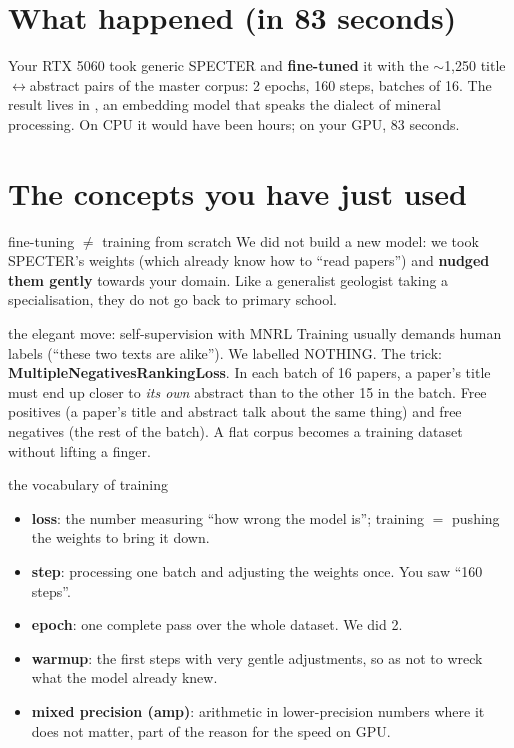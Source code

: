 \documentclass[11pt,a4paper]{article}
\begin{document}
\section{What happened (in 83 seconds)}

Your RTX 5060 took generic SPECTER and \textbf{fine-tuned} it with the $\sim$1,250
title$\leftrightarrow$abstract pairs of the master corpus: 2 epochs, 160 steps, batches of 16.
The result lives in , an embedding model that speaks the dialect
of mineral processing. On CPU it would have been hours; on your GPU, 83 seconds.

\section{The concepts you have just used}

\begin{concepto}{fine-tuning $\neq$ training from scratch}
We did not build a new model: we took SPECTER's weights (which already know how to ``read
papers'') and \textbf{nudged them gently} towards your domain. Like a generalist geologist
taking a specialisation, they do not go back to primary school.
\end{concepto}

\begin{concepto}{the elegant move: self-supervision with MNRL}
Training usually demands human labels (``these two texts are alike''). We labelled NOTHING. The
trick: \textbf{MultipleNegativesRankingLoss}. In each batch of 16 papers, a paper's title must
end up closer to \emph{its own} abstract than to the other 15 in the batch. Free positives (a
paper's title and abstract talk about the same thing) and free negatives (the rest of the
batch). A flat corpus becomes a training dataset without lifting a finger.
\end{concepto}

\begin{concepto}{the vocabulary of training}
\begin{itemize}
  \item \textbf{loss}: the number measuring ``how wrong the model is''; training $=$ pushing the
        weights to bring it down.
  \item \textbf{step}: processing one batch and adjusting the weights once. You saw ``160 steps''.
  \item \textbf{epoch}: one complete pass over the whole dataset. We did 2.
  \item \textbf{warmup}: the first steps with very gentle adjustments, so as not to wreck what
        the model already knew.
  \item \textbf{mixed precision (amp)}: arithmetic in lower-precision numbers where it does not
        matter, part of the reason for the speed on GPU.
\end{itemize}
\end{concepto}
\end{document}
